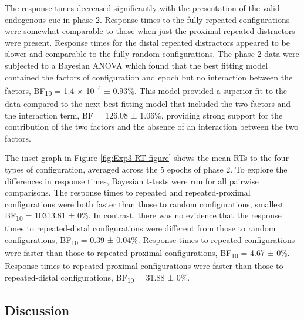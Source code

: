 \documentclass[
  man,floatsintext]{apa7}
\begin{document}
The response times decreased significantly with the presentation of the valid endogenous cue in phase 2. Response times to the fully repeated configurations were somewhat comparable to those when just the proximal repeated distractors were present. Response times for the distal repeated distractors appeared to be slower and comparable to the fully random configurations. The phase 2 data were subjected to a Bayesian ANOVA which found that the best fitting model contained the factors of configuration and epoch but no interaction between the factors, BF\textsubscript{10} = 1.4 × 10\textsuperscript{14} ± 0.93\%. This model provided a superior fit to the data compared to the next best fitting model that included the two factors and the interaction term, BF = 126.08 ± 1.06\%, providing strong support for the contribution of the two factors and the absence of an interaction between the two factors.

The inset graph in Figure \ref{fig:Exp3-RT-figure} shows the mean RTs to the four types of configuration, averaged across the 5 epochs of phase 2. To explore the differences in response times, Bayesian t-tests were run for all pairwise comparisons. The response times to repeated and repeated-proximal configurations were both faster than those to random configurations, smallest BF\textsubscript{10} = 10313.81 ± 0\%. In contrast, there was no evidence that the response times to repeated-distal configurations were different from those to random configurations, BF\textsubscript{10} = 0.39 ± 0.04\%. Response times to repeated configurations were faster than those to repeated-proximal configurations, BF\textsubscript{10} = 4.67 ± 0\%. Response times to repeated-proximal configurations were faster than those to repeated-distal configurations, BF\textsubscript{10} = 31.88 ± 0\%.

\hypertarget{discussion-2}{%
\subsection{Discussion}\label{discussion-2}}
\end{document}
